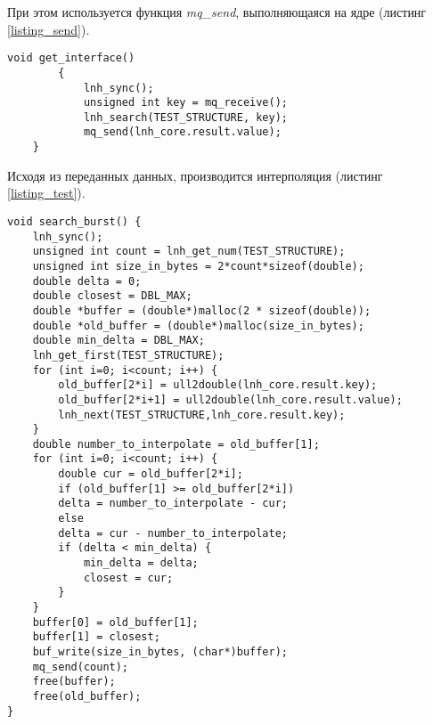 При этом используется функция \textit{mq\_send}, выполняющаяся на ядре (листинг \ref{listing_send}).

\begin{center}
	\begin{lstlisting}[label=listing_send,caption=Создание и заполнение графа]
		void get_interface()
		{
			lnh_sync();
			unsigned int key = mq_receive();
			lnh_search(TEST_STRUCTURE, key);
			mq_send(lnh_core.result.value);
	}	\end{lstlisting}
\end{center}

\clearpage
Исходя из переданных данных, производится интерполяция (листинг \ref{listing_test}).

\begin{center}
	\begin{lstlisting}[label=listing_test,caption=Интерполяция переданных  величин]
void search_burst() {
	lnh_sync();
	unsigned int count = lnh_get_num(TEST_STRUCTURE);
	unsigned int size_in_bytes = 2*count*sizeof(double);
	double delta = 0;
	double closest = DBL_MAX;
	double *buffer = (double*)malloc(2 * sizeof(double));
	double *old_buffer = (double*)malloc(size_in_bytes);
	double min_delta = DBL_MAX;
	lnh_get_first(TEST_STRUCTURE);
	for (int i=0; i<count; i++) {
		old_buffer[2*i] = ull2double(lnh_core.result.key);
		old_buffer[2*i+1] = ull2double(lnh_core.result.value);
		lnh_next(TEST_STRUCTURE,lnh_core.result.key);
	}
	double number_to_interpolate = old_buffer[1];
	for (int i=0; i<count; i++) {
		double cur = old_buffer[2*i];
		if (old_buffer[1] >= old_buffer[2*i])
		delta = number_to_interpolate - cur;
		else
		delta = cur - number_to_interpolate;
		if (delta < min_delta) {
			min_delta = delta;
			closest = cur;
		}
	}
	buffer[0] = old_buffer[1];
	buffer[1] = closest;
	buf_write(size_in_bytes, (char*)buffer);
	mq_send(count);
	free(buffer);
	free(old_buffer);
}

\end{lstlisting}
\end{center}
